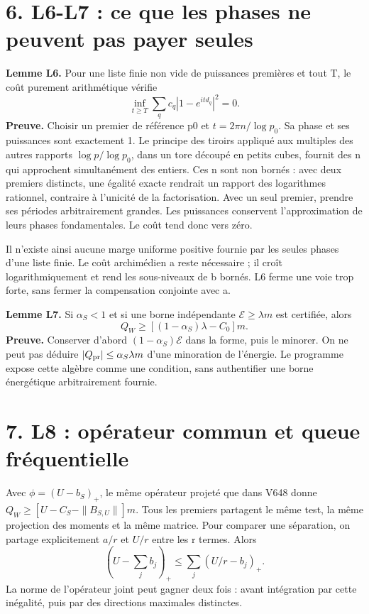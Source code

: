 \documentclass[
  10pt,
  a4paper,
]{article}
\begin{document}
\hypertarget{l6-l7-ce-que-les-phases-ne-peuvent-pas-payer-seules}{%
\section{6. L6-L7 : ce que les phases ne peuvent pas payer
seules}\label{l6-l7-ce-que-les-phases-ne-peuvent-pas-payer-seules}}

\textbf{Lemme L6.} Pour une liste finie non vide de puissances premières
et tout T, le coût purement arithmétique vérifie \[
\inf_{t\ge T}\sum_q c_q|1-e^{itd_q}|^2=0.
\] \textbf{Preuve.} Choisir un premier de référence p0 et
\(t=2\pi n/\log p_0\). Sa phase et ses puissances sont exactement 1. Le
principe des tiroirs appliqué aux multiples des autres rapports
\(\log p/\log p_0\), dans un tore découpé en petits cubes, fournit des n
qui approchent simultanément des entiers. Ces n sont non bornés : avec
deux premiers distincts, une égalité exacte rendrait un rapport des
logarithmes rationnel, contraire à l'unicité de la factorisation. Avec
un seul premier, prendre ses périodes arbitrairement grandes. Les
puissances conservent l'approximation de leurs phases fondamentales. Le
coût tend donc vers zéro.

Il n'existe ainsi aucune marge uniforme positive fournie par les seules
phases d'une liste finie. Le coût archimédien a reste nécessaire ; il
croît logarithmiquement et rend les sous-niveaux de b bornés. L6 ferme
une voie trop forte, sans fermer la compensation conjointe avec a.

\textbf{Lemme L7.} Si \(\alpha_S<1\) et si une borne indépendante
\(\mathcal E\ge\lambda m\) est certifiée, alors \[
Q_W\ge[(1-\alpha_S)\lambda-C_0]m.
\] \textbf{Preuve.} Conserver d'abord \((1-\alpha_S)\mathcal E\) dans la
forme, puis le minorer. On ne peut pas déduire
\(|Q_{\rm pr}|\le\alpha_S\lambda m\) d'une minoration de l'énergie. Le
programme expose cette algèbre comme une condition, sans authentifier
une borne énergétique arbitrairement fournie.

\hypertarget{l8-opuxe9rateur-commun-et-queue-fruxe9quentielle}{%
\section{7. L8 : opérateur commun et queue
fréquentielle}\label{l8-opuxe9rateur-commun-et-queue-fruxe9quentielle}}

Avec \(\phi=(U-b_S)_+\), le même opérateur projeté que dans V648 donne
\(Q_W\ge[U-C_S-\|B_{S,U}\|]m\). Tous les premiers partagent le même
test, la même projection des moments et la même matrice. Pour comparer
une séparation, on partage explicitement \(a/r\) et \(U/r\) entre les r
termes. Alors \[
\left(U-\sum_j b_j\right)_+\le\sum_j(U/r-b_j)_+.
\] La norme de l'opérateur joint peut gagner deux fois : avant
intégration par cette inégalité, puis par des directions maximales
distinctes.
\end{document}
